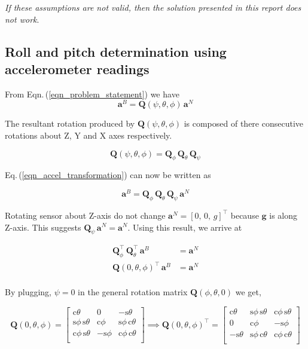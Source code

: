 \documentclass[12pt, a4paper]{article}
\begin{document}
\textit{If these assumptions are not valid, then the solution presented in this report does not work}.

\subsection{Roll and pitch determination using accelerometer readings}
From Eqn.\,(\ref{eqn_problem_statement}) we have
\begin{equation}
\bm{a}^{B} = \bm{Q}(\psi,\theta,\phi)\,\bm{a}^{N}
\label{eqn_accel_transformation}
\end{equation}

The resultant rotation produced by $\bm{Q}(\psi,\theta,\phi)$ is composed of there consecutive rotations about Z, Y and X axes respectively.

\begin{equation}
\bm{Q}(\psi,\theta,\phi) = \bm{Q}_{\phi}\,\bm{Q}_{\theta}\,\bm{Q}_{\psi}
\end{equation}

Eq.\,(\ref{eqn_accel_transformation}) can now be written as

\begin{equation}
\bm{a}^{B} = \bm{Q}_{\phi}\,\bm{Q}_{\theta}\,\bm{Q}_{\psi}\,\bm{a}^{N}
\end{equation}

Rotating sensor about Z-axis do not change $\bm{a}^{N} = [0,\,0,\,g]^{\intercal}$ because $\bm{g}$ is along Z-axis. This suggests $\bm{Q}_{\psi}\,\bm{a}^{N} = \bm{a}^{N}$. Using this result, we arrive at

\begin{equation}
\begin{split}
\bm{Q}_{\phi}^{\intercal}\,\bm{Q}_{\theta}^{\intercal}\,\bm{a}^{B} &= \bm{a}^{N} \\
\bm{Q}(0,\theta,\phi)^{\intercal}\,\bm{a}^{B} &= \bm{a}^{N} \\
\end{split}
\label{eqn_tilt_eqn}
\end{equation}

By plugging, $\psi=0$ in the general rotation matrix $\bm{Q}(\phi,\theta,0)$ we get,

\begin{equation}
\bm{Q}(0,\theta,\phi) =
\begin{bmatrix}
\text{c}\theta & 0 & -\text{s}\theta \\
\text{s}\phi\,\text{s}\theta & \text{c}\phi & \text{s}\phi\,\text{c}\theta \\
\text{c}\phi\,\text{s}\theta & -\text{s}\phi & \text{c}\phi\,\text{c}\theta \\
\end{bmatrix} \implies
\bm{Q}(0,\theta,\phi)^{\intercal} =
\begin{bmatrix}
\text{c}\theta & \text{s}\phi\,\text{s}\theta &  \text{c}\phi\,\text{s}\theta \\
0 & \text{c}\phi & -\text{s}\phi \\
-\text{s}\theta& \text{s}\phi\,\text{c}\theta & \text{c}\phi\,\text{c}\theta \\
\end{bmatrix}
\label{eqn_q_transpose}
\end{equation} 
\end{document}
